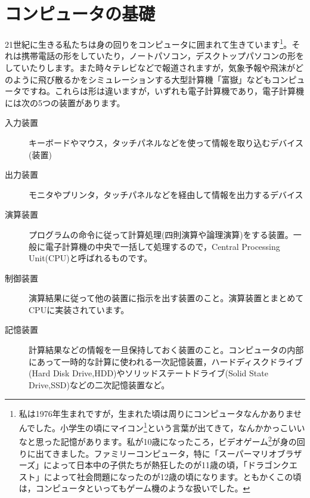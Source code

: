 \documentclass{ltjsbook}
\begin{document}
\section{コンピュータの基礎}
21世紀に生きる私たちは身の回りをコンピュータに囲まれて生きています\footnote{私は1976年生まれですが，生まれた頃は周りにコンピュータなんかありませんでした。小学生の頃にマイコン\footnote{マイクロコンピュータ，小さなコンピュータという意味でもありますが，My Computer，私のコンピュータという意味でもあります。つまり個人単位でコンピュータが使えるようになった，というだけでも大きな出来事だったのです。}という言葉が出てきて，なんかかっこいいなと思った記憶があります。私が10歳になったころ，ビデオゲーム\footnote{テレビゲームでやるゲームが家庭でできるようになり，それをこのように呼びました。}が身の回りに出てきました。ファミリーコンピュータ，特に「スーパーマリオブラザーズ」によって日本中の子供たちが熱狂したのが11歳の頃，「ドラゴンクエスト」によって社会問題になったのが12歳の頃になります。ともかくこの頃は，コンピュータといってもゲーム機のような扱いでした。}。それは携帯電話の形をしていたり，ノートパソコン，デスクトップパソコンの形をしていたりします。また時々テレビなどで報道されますが，気象予報や飛沫がどのように飛び散るかをシミュレーションする大型計算機「富嶽」などもコンピュータですね。これらは形は違いますが，いずれも電子計算機であり，電子計算機には次の5つの装置があります。
\begin{description}
	\item[入力装置] キーボードやマウス，タッチパネルなどを使って情報を取り込むデバイス(装置)
	\item[出力装置] モニタやプリンタ，タッチパネルなどを経由して情報を出力するデバイス
	\item[演算装置] プログラムの命令に従って計算処理(四則演算や論理演算)をする装置。一般に電子計算機の中央で一括して処理するので，Central Processing Unit(CPU)と呼ばれるものです。
	\item[制御装置] 演算結果に従って他の装置に指示を出す装置のこと。演算装置とまとめてCPUに実装されています。
	\item[記憶装置] 計算結果などの情報を一旦保持しておく装置のこと。コンピュータの内部にあって一時的な計算に使われる一次記憶装置，ハードディスクドライブ(Hard Disk Drive,HDD)やソリッドステートドライブ(Solid State Drive,SSD)などの二次記憶装置など。
\end{description} 
\end{document}
